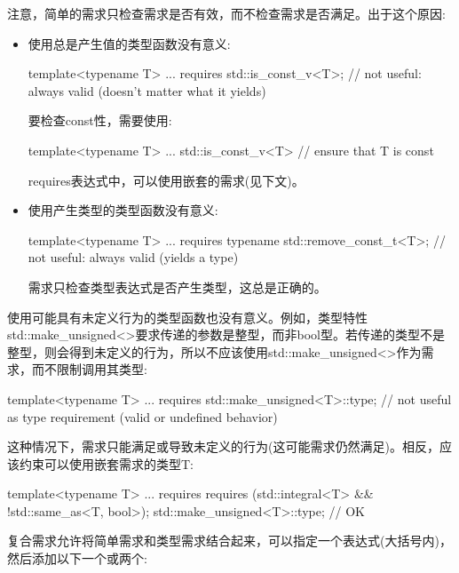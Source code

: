 注意，简单的需求只检查需求是否有效，而不检查需求是否满足。出于这个原因:

\begin{itemize}
\item
使用总是产生值的类型函数没有意义:

\begin{cpp}
template<typename T>
... requires {
	std::is_const_v<T>; // not useful: always valid (doesn’t matter what it yields)
}
\end{cpp}

要检查const性，需要使用:

\begin{cpp}
template<typename T>
... std::is_const_v<T> // ensure that T is const
\end{cpp}

requires表达式中，可以使用嵌套的需求(见下文)。

\item
使用产生类型的类型函数没有意义:

\begin{cpp}
template<typename T>
... requires {
	typename std::remove_const_t<T>; // not useful: always valid (yields a type)
}
\end{cpp}

需求只检查类型表达式是否产生类型，这总是正确的。
\end{itemize}

使用可能具有未定义行为的类型函数也没有意义。例如，类型特性std::make\_unsigned<>要求传递的参数是整型，而非bool型。若传递的类型不是整型，则会得到未定义的行为，所以不应该使用std::make\_unsigned<>作为需求，而不限制调用其类型:

\begin{cpp}
template<typename T>
... requires {
	std::make_unsigned<T>::type; // not useful as type requirement (valid or undefined behavior)
}
\end{cpp}

这种情况下，需求只能满足或导致未定义的行为(这可能需求仍然满足)。相反，应该约束可以使用嵌套需求的类型T:

\begin{cpp}
template<typename T>
... requires {
	requires (std::integral<T> && !std::same_as<T, bool>);
	std::make_unsigned<T>::type; // OK
}
\end{cpp}


复合需求允许将简单需求和类型需求结合起来，可以指定一个表达式(大括号内)，然后添加以下一个或两个:

